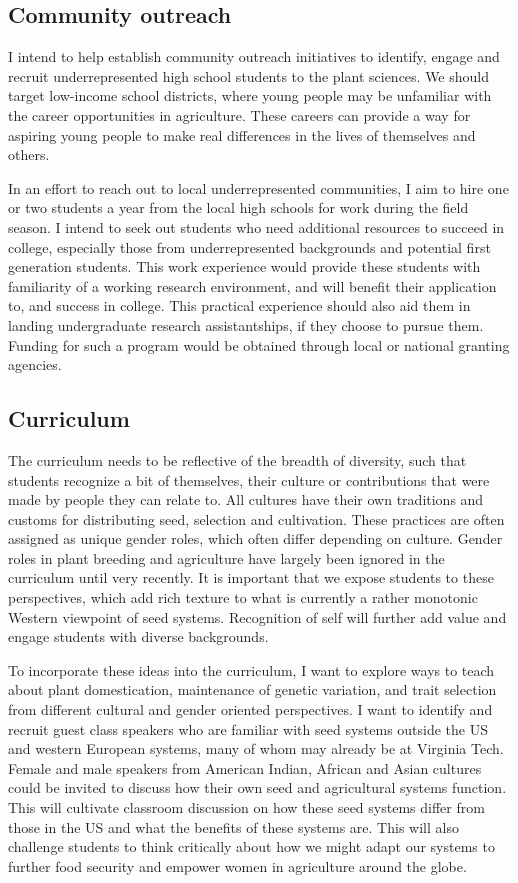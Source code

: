 \documentclass[11pt]{article}
\begin{document}
\subsection*{Community outreach}

I intend to help establish community outreach initiatives to identify, engage and recruit underrepresented high school students to the plant sciences. We should target low-income school districts, where young people may be unfamiliar with the career opportunities in agriculture. These careers can provide a way for aspiring young people to make real differences in the lives of themselves and others. 

In an effort to reach out to local underrepresented communities, I aim to hire one or two students a year from the local high schools for work during the field season. I intend to seek out students who need additional resources to succeed in college, especially those from underrepresented backgrounds and potential first generation students. This work experience would provide these students with familiarity of a working research environment, and will benefit their application to, and success in college. This practical experience should also aid them in landing undergraduate research assistantships, if they choose to pursue them. Funding for such a program would be obtained through local or national granting agencies.

\subsection*{Curriculum}

The curriculum needs to be reflective of the breadth of diversity, such that students recognize a bit of themselves, their culture or contributions that were made by people they can relate to. All cultures have their own traditions and customs for distributing seed, selection and cultivation. These practices are often assigned as unique gender roles, which often differ depending on culture. Gender roles in plant breeding and agriculture have largely been ignored in the curriculum until very recently. It is important that we expose students to these perspectives, which add rich texture to what is currently a rather monotonic Western viewpoint of seed systems. Recognition of self will further add value and engage students with diverse backgrounds.

To incorporate these ideas into the curriculum, I want to explore ways to teach about plant domestication, maintenance of genetic variation, and trait selection from different cultural and gender oriented perspectives. I want to identify and recruit guest class speakers who are familiar with seed systems outside the US and western European systems, many of whom may already be at Virginia Tech. Female and male speakers from American Indian, African and Asian cultures could be invited to discuss how their own seed and agricultural systems function. This will cultivate classroom discussion on how these seed systems differ from those in the US and what the benefits of these systems are. This will also challenge students to think critically about how we might adapt our systems to further food security and empower women in agriculture around the globe. 
\end{document}
